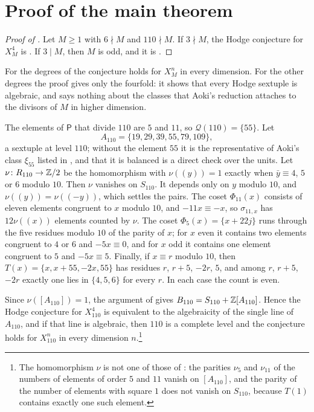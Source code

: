 \section{Proof of the main theorem}\label{sec:proof}

\begin{proof}[Proof of ]
Let $M\ge1$ with $6\nmid M$ and $110\nmid M$. If $3\nmid M$, the Hodge
conjecture for $X^{4}_{M}$ is . If $3\mid M$, then $M$
is odd, and it is .
\end{proof}

For the degrees of  the conjecture holds for $X^{n}_{M}$ in
every dimension. For the other degrees the proof gives only the fourfold: it
shows that every Hodge sextuple is algebraic, and says nothing about the
classes that Aoki's reduction attaches to the divisors of $M$ in higher
dimension.

\begin{remark}\label{rem:110}
The elements of $\mathsf P$ that divide $110$ are $5$ and $11$, so
$\mathcal Q(110)=\{55\}$. Let
\[
  A_{110}=\{19,29,39,55,79,109\},
\]
a sextuple at level $110$; without the element $55$ it is the representative
of Aoki's class $\xi_{55}$ listed in \cite[Table~4]{MMRV26}, and that it is
balanced is a direct check over the units. Let $\nu\colon R_{110}\to\mathbb{Z}/2$ be the
homomorphism with $\nu((y))=1$ exactly when $\bar y\equiv4$, $5$ or $6$
modulo $10$. Then $\nu$ vanishes on $S_{110}$. It depends only on $y$ modulo
$10$, and $\nu((y))=\nu((-y))$, which settles the pairs. The coset
$\Phi_{11}(x)$ consists of eleven elements congruent to $x$ modulo $10$, and
$-11x\equiv-x$, so $\sigma_{11,x}$ has $12\nu((x))$ elements counted by $\nu$.
The coset $\Phi_{5}(x)=\{x+22j\}$ runs through the five residues modulo $10$
of the parity of $x$; for $x$ even it contains two elements congruent to $4$
or $6$ and $-5x\equiv0$, and for $x$ odd it contains one element congruent to
$5$ and $-5x\equiv5$. Finally, if $x\equiv r$ modulo $10$, then
$T(x)=\{x,x+55,-2x,55\}$ has residues $r$, $r+5$, $-2r$, $5$, and among
$r$, $r+5$, $-2r$ exactly one lies in $\{4,5,6\}$ for every $r$. In each case
the count is even.

Since $\nu([A_{110}])=1$, the argument of  gives
$B_{110}=S_{110}+\mathbb{Z}[A_{110}]$. Hence the Hodge conjecture for $X^{4}_{110}$
is equivalent to the algebraicity of the single line of $A_{110}$, and if
that line is algebraic, then $110$ is a complete level and the conjecture
holds for $X^{n}_{110}$ in every dimension $n$.\footnote{The homomorphism
$\nu$ is not one of those of : the parities $\nu_{5}$
and $\nu_{11}$ of the numbers of elements of order $5$ and $11$ vanish on
$[A_{110}]$, and the parity of the number of elements with square $1$ does
not vanish on $S_{110}$, because $T(1)$ contains exactly one such element.}
\end{remark}
